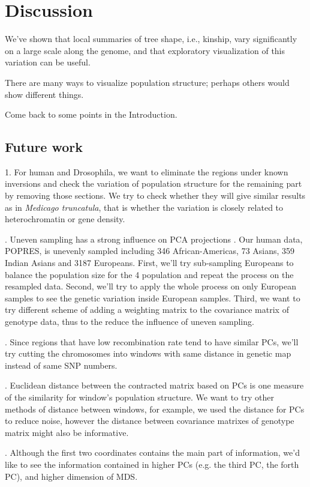 \documentclass[11pt, oneside]{article}   	%
\begin{document}
\section{Discussion}

We've shown that local summaries of tree shape, i.e., kinship, vary significantly on a large scale along the genome,
and that exploratory visualization of this variation can be useful.

There are many ways to visualize population structure; perhaps others would show different things.

Come back to some points in the Introduction.

\subsection{Future work}
1. For human and Drosophila, we want to eliminate the regions under known inversions and check the variation of population structure for the remaining part by removing those sections. We try to check whether they will give similar results as in \textit{Medicago truncatula}, that is whether the variation is closely related to heterochromatin or gene density.

. Uneven sampling has a strong influence on PCA projections \citep{mcvean2009genealogical}. 
Our human data, POPRES, is unevenly sampled including 346 African-Americas, 73 Asians, 359 Indian Asians and 3187 Europeans. 
First, we'll try sub-sampling Europeans to balance the population size for the 4 population and repeat the process on the resampled data. 
Second, we'll try to apply the whole process on only European samples to see the genetic variation inside European samples. 
Third, we want to try different scheme of adding a weighting matrix to the covariance matrix of genotype data, thus to the reduce the influence of uneven sampling.

. Since regions that have low recombination rate tend to have similar PCs, we'll try cutting the chromosomes into windows with same distance in genetic map instead of same SNP numbers.

. Euclidean distance between the contracted matrix based on PCs is one measure of the similarity for window's population structure.
We want to try other methods of distance between windows, for example, we used the distance for PCs to reduce noise, however the distance between covariance matrixes of genotype matrix might also be informative.

. Although the first two coordinates contains the main part of information, we'd like to see the information contained in higher PCs (e.g. the third PC, the forth PC), and higher dimension of MDS.


  
\end{document}
